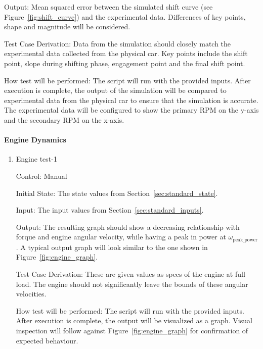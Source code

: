 \documentclass[12pt, titlepage]{article}
\begin{document}
\begin{enumerate}
  Output: Mean squared error between the simulated shift curve (see Figure~\ref{fig:shift_curve}) and the experimental data. Differences of key points, shape and magnitude will be considered.

  Test Case Derivation: Data from the simulation should closely match the experimental data collected from the physical car. Key points include the shift point, slope during shifting phase, engagement point and the final shift point.

  How test will be performed: The script will run with the provided inputs. After execution is complete, the output of the simulation will be compared to experimental data from the physical car to ensure that the simulation is accurate. The experimental data will be configured to show the primary RPM on the y-axis and the secondary RPM on the x-axis.

\end{enumerate}

\paragraph{Engine Dynamics}

\begin{enumerate}

  \item{Engine test-1\\}
  
  Control: Manual
            
  Initial State: The state values from Section~\ref{sec:standard_state}.
  
  Input: The input values from Section~\ref{sec:standard_inputs}.
            
  Output: The resulting graph should show a decreasing relationship with forque and engine angular velocity, while having a peak in power at $\omega_\text{peak\_power}$. A typical output graph will look similar to the one shown in Figure~\ref{fig:engine_graph}.
  
  Test Case Derivation: These are given values as specs of the engine at full load. The engine should not significantly leave the bounds of these angular velocities.
  
  How test will be performed: The script will run with the provided inputs. After execution is complete, the output will be visualized as a graph. Visual inspection will follow against Figure~\ref{fig:engine_graph} for confirmation of expected behaviour.

\end{enumerate}
\end{document}
